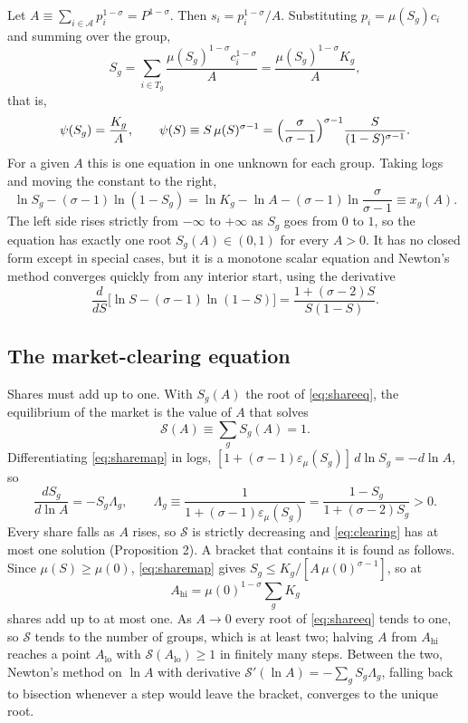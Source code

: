 \documentclass[11pt]{article}
\theoremstyle{remark}
\newcommand{\cA}{\mathcal A}
\begin{document}
Let $A\equiv\sum_{i\in\cA}p_i^{1-\sigma}=P^{1-\sigma}$. Then $s_i=p_i^{1-\sigma}/A$.
Substituting $p_i=\mu(S_g)c_i$ and summing over the group,
\[
  S_g=\sum_{i\in T_g}\frac{\mu(S_g)^{1-\sigma}c_i^{1-\sigma}}{A}
  =\frac{\mu(S_g)^{1-\sigma}K_g}{A},
\]
that is,
\begin{equation}
  \psi(S_g)=\frac{K_g}{A},
  \qquad
  \psi(S)\equiv S\,\mu(S)^{\sigma-1}
  =\Bigl(\frac{\sigma}{\sigma-1}\Bigr)^{\sigma-1}\frac{S}{(1-S)^{\sigma-1}} .
  \label{eq:sharemap}
\end{equation}
For a given $A$ this is one equation in one unknown for each group. Taking logs and
moving the constant to the right,
\begin{equation}
  \ln S_g-(\sigma-1)\ln(1-S_g)=\ln K_g-\ln A-(\sigma-1)\ln\frac{\sigma}{\sigma-1}
  \equiv x_g(A).
  \label{eq:shareeq}
\end{equation}
The left side rises strictly from $-\infty$ to $+\infty$ as $S_g$ goes from $0$ to
$1$, so the equation has exactly one root $S_g(A)\in(0,1)$ for every $A>0$. It has no
closed form except in special cases, but it is a monotone scalar equation and Newton's
method converges quickly from any interior start, using the derivative
\[
  \frac{d}{dS}\bigl[\ln S-(\sigma-1)\ln(1-S)\bigr]
  =\frac{1+(\sigma-2)S}{S(1-S)} .
\]

\subsection{The market-clearing equation}

Shares must add up to one. With $S_g(A)$ the root of \eqref{eq:shareeq}, the
equilibrium of the market is the value of $A$ that solves
\begin{equation}
  \mathcal S(A)\equiv\sum_gS_g(A)=1 .
  \label{eq:clearing}
\end{equation}
Differentiating \eqref{eq:sharemap} in logs, $[1+(\sigma-1)\varepsilon_\mu(S_g)]\,
d\ln S_g=-d\ln A$, so
\begin{equation}
  \frac{dS_g}{d\ln A}=-S_g\Lambda_g,
  \qquad
  \Lambda_g\equiv\frac{1}{1+(\sigma-1)\varepsilon_\mu(S_g)}
  =\frac{1-S_g}{1+(\sigma-2)S_g}>0 .
  \label{eq:dSdA}
\end{equation}
Every share falls as $A$ rises, so $\mathcal S$ is strictly decreasing and
\eqref{eq:clearing} has at most one solution (Proposition 2). A bracket that contains
it is found as follows. Since $\mu(S)\ge\mu(0)$, \eqref{eq:sharemap} gives
$S_g\le K_g/[A\,\mu(0)^{\sigma-1}]$, so at
\[
  A_{\mathrm{hi}}=\mu(0)^{1-\sigma}\sum_gK_g
\]
shares add up to at most one. As $A\to0$ every root of \eqref{eq:shareeq} tends to
one, so $\mathcal S$ tends to the number of groups, which is at least two; halving $A$
from $A_{\mathrm{hi}}$ reaches a point $A_{\mathrm{lo}}$ with
$\mathcal S(A_{\mathrm{lo}})\ge1$ in finitely many steps. Between the two, Newton's
method on $\ln A$ with derivative $\mathcal S'(\ln A)=-\sum_gS_g\Lambda_g$, falling
back to bisection whenever a step would leave the bracket, converges to the unique
root.
\end{document}

